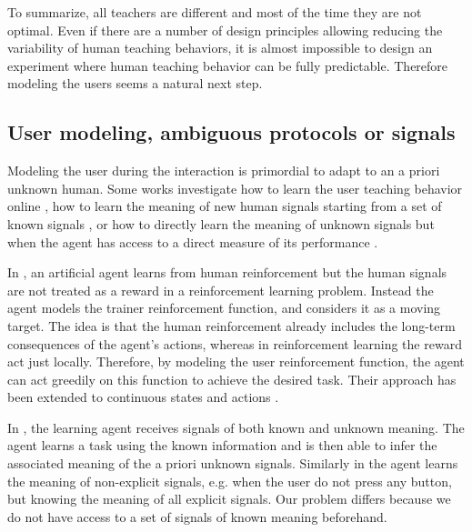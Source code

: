 \transition

To summarize, all teachers are different and most of the time they are not optimal. Even if there are a number of design principles allowing reducing the variability of human teaching behaviors, it is almost impossible to design an experiment where human teaching behavior can be fully predictable. Therefore modeling the users seems a natural next step.

\subsection{User modeling, ambiguous protocols or signals}


Modeling the user during the interaction is primordial to adapt to an a priori unknown human. Some works investigate how to learn the user teaching behavior online \cite{knox2009interactively}, how to learn the meaning of new human signals starting from a set of known signals \cite{macl11simul,loftinlearning}, or how to directly learn the meaning of unknown signals but when the agent has access to a direct measure of its performance \cite{branavan2011learning,kim2012unsupervised,doshi2008spoken}.

In \cite{knox2009interactively}, an artificial agent learns from human reinforcement but the human signals are not treated as a reward in a reinforcement learning problem. Instead the agent models the trainer reinforcement function, and considers it as a moving target. The idea is that the human reinforcement already includes the long-term consequences of the agent's actions, whereas in reinforcement learning the reward act just locally. Therefore, by modeling the user reinforcement function, the agent can act greedily on this function to achieve the desired task. Their approach has been extended to continuous states and actions \cite{vien2013learning}.

In \cite{macl11simul}, the learning agent receives signals of both known and unknown meaning. The agent learns a task using the known information and is then able to infer the associated meaning of the a priori unknown signals. Similarly in \cite{loftinlearning} the agent learns the meaning of non-explicit signals, e.g. when the user do not press any button, but knowing the meaning of all explicit signals. Our problem differs because we do not have access to a set of signals of known meaning beforehand.

